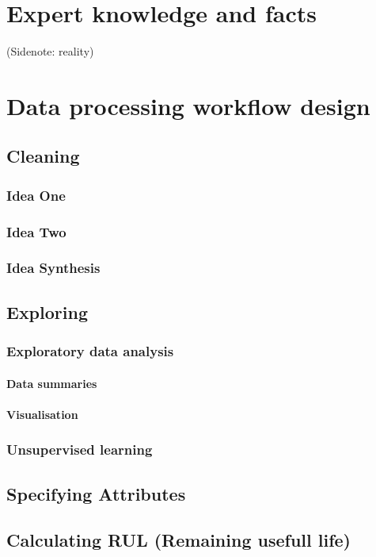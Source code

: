 
\section{Expert knowledge and facts}
(Sidenote: reality)
\section{Data processing workflow design}
	\subsection{Cleaning}
		\subsubsection{Idea One}
		\subsubsection{Idea Two}
		\subsubsection{Idea Synthesis}
	\subsection{Exploring}
		\subsubsection{Exploratory data analysis}
			\paragraph{Data summaries}
			\paragraph{Visualisation}
		\subsubsection{Unsupervised learning}
	\subsection{Specifying Attributes}
	\subsection{Calculating RUL (Remaining usefull life)}
	


